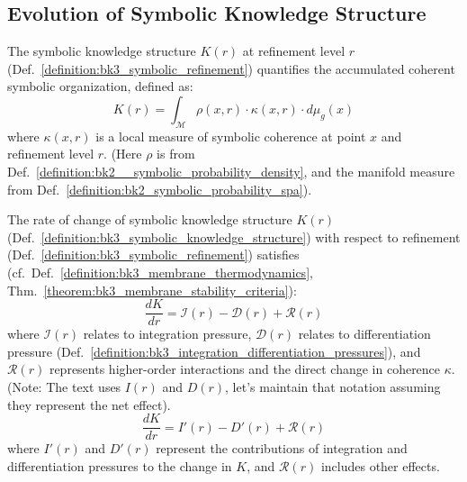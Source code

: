 \subsection{Evolution of Symbolic Knowledge Structure} \label{subsec:bk3_evolution_symbolic_knowledge_structure}

\begin{definition} \label{definition:bk3_symbolic_knowledge_structure}
The symbolic knowledge structure $K(r)$ at refinement level $r$ (Def.~\ref{definition:bk3_symbolic_refinement}) quantifies the accumulated coherent symbolic organization, defined as:
\[
K(r) = \int_{\mathcal{M}} \rho(x,r) \cdot \kappa(x,r) \cdot d\mu_g(x)
\]
where $\kappa(x,r)$ is a local measure of symbolic coherence at point $x$ and refinement level $r$. (Here $\rho$ is from Def.~\ref{definition:bk2__symbolic_probability_density}, and the manifold measure from Def.~\ref{definition:bk2_symbolic_probability_spa}).
\end{definition}

\begin{theorem} \label{theorem:bk3_evolution_of_symbolic_knowledge}
The rate of change of symbolic knowledge structure $K(r)$ (Def.~\ref{definition:bk3_symbolic_knowledge_structure}) with respect to refinement (Def.~\ref{definition:bk3_symbolic_refinement}) satisfies (cf.~Def.~\ref{definition:bk3_membrane_thermodynamics}, Thm.~\ref{theorem:bk3_membrane_stability_criteria}):
\[
\frac{dK}{dr} = \mathcal{I}(r) - \mathcal{D}(r) + \mathcal{R}(r)
\]
where $\mathcal{I}(r)$ relates to integration pressure, $\mathcal{D}(r)$ relates to differentiation pressure (Def.~\ref{definition:bk3_integration_differentiation_pressures}), and $\mathcal{R}(r)$ represents higher-order interactions and the direct change in coherence $\kappa$. (Note: The text uses $I(r)$ and $D(r)$, let's maintain that notation assuming they represent the net effect).
\[
\frac{dK}{dr} = I'(r) - D'(r) + \mathcal{R}(r)
\]
where $I'(r)$ and $D'(r)$ represent the contributions of integration and differentiation pressures to the change in $K$, and $\mathcal{R}(r)$ includes other effects.
\end{theorem}

